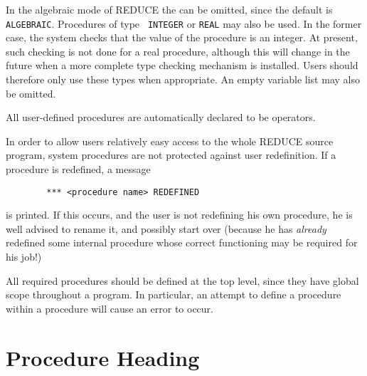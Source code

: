 \documentclass[11pt,letterpaper]{book}
\newcommand{\REDUCE}{REDUCE}
\begin{document}
In the algebraic mode of {\REDUCE} the {\tt <procedure type>} can be
omitted, since the default is {\tt ALGEBRAIC}.  Procedures of type {\tt
INTEGER} or {\tt REAL} may also be used.  In the former case, the system
checks that the value of the procedure is an integer.  At present, such
checking is not done for a real procedure, although this will change in
the future when a more complete type checking mechanism is installed.
Users should therefore only use these types when appropriate.  An empty
variable list may also be omitted.

All user-defined procedures are automatically declared to be operators.

In order to allow users relatively easy access to the whole {\REDUCE} source
program, system procedures are not protected against user redefinition. If
a procedure is redefined, a message
{\small\begin{verbatim}
        *** <procedure name> REDEFINED
\end{verbatim}}
is printed. If this occurs, and the user is not redefining his own
procedure, he is well advised to rename it, and possibly start over
(because he has {\em already\/} redefined some internal procedure whose correct
functioning may be required for his job!)

All required procedures should be defined at the top level, since they
have global scope throughout a program. In particular, an attempt to
define a procedure within a procedure will cause an error to occur.

\section{Procedure Heading}
\end{document}
